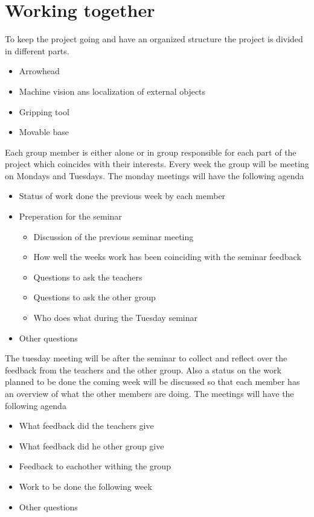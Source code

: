 \section{Working together}
To keep the project going and have an organized structure the project is divided 
in different parts. 
\begin{itemize}
    \item Arrowhead
    \item Machine vision ans localization of external objects
    \item Gripping tool
    \item Movable base
\end{itemize}
Each group member is either alone or in group responsible for each part of the 
project which coincides with their interests. 
Every week the group will be meeting on Mondays and Tuesdays. 
The monday meetings will have the following agenda 
\begin{itemize}
    \item Status of work done the previous week by each member
    \item Preperation for the seminar
    \begin{itemize}
        \item Discussion of the previous seminar meeting
        \item How well the weeks work has been coinciding with the seminar feedback
        \item Questions to ask the teachers
        \item Questions to ask the other group
        \item Who does what during the Tuesday seminar
    \end{itemize}
    \item Other questions
\end{itemize}
The tuesday meeting will be after the seminar to collect and reflect over the 
feedback from the teachers and the other group. Also a status on the work planned to be done 
the coming week will be discussed so that each member has an overview of what 
the other members are doing. The meetings will have the following agenda
\begin{itemize}
    \item What feedback did the teachers give
    \item What feedback did he other group give 
    \item Feedback to eachother withing the group
    \item Work to be done the following week
    \item Other questions
\end{itemize}









